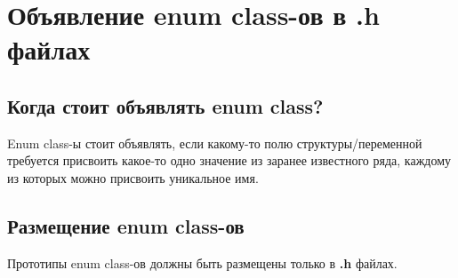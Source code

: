 \chapter{Объявление enum class-ов в .h файлах}\label{ec:h:0}
\section{Когда стоит объявлять enum class?}
Enum class-ы стоит объявлять, если какому-то полю структуры/переменной требуется присвоить какое-то одно значение из заранее известного ряда, каждому из которых можно присвоить уникальное имя.

\section{Размещение enum class-ов}
Прототипы enum class-ов должны быть размещены только в \textbf{.h} файлах.

